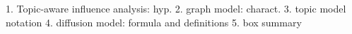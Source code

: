 1. Topic-aware influence analysis: hyp.
2. graph model: charact.
3. topic model notation
4. diffusion model: formula and definitions
5. box summary